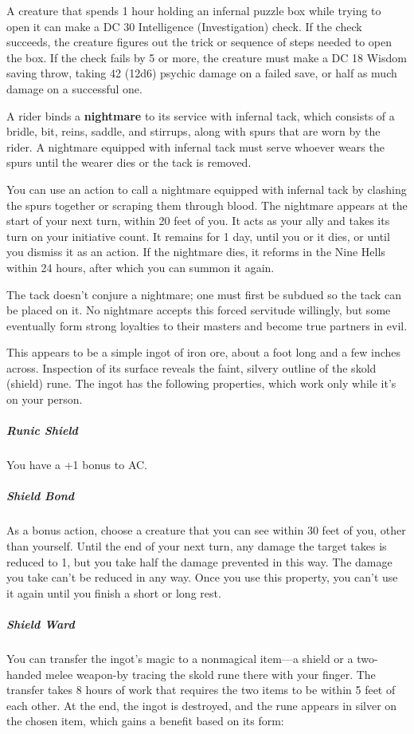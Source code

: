 \documentclass[10pt,a4paper,twoside,bg=print,twocolumn,openany,nodeprecatedcode]{dndbook}
\begin{document}
A creature that spends 1 hour holding an infernal puzzle box while trying to open it can make a DC 30 Intelligence (Investigation) check. If the check succeeds, the creature figures out the trick or sequence of steps needed to open the box. If the check fails by 5 or more, the creature must make a DC 18 Wisdom saving throw, taking 42 (12d6) psychic damage on a failed save, or half as much damage on a successful one.

A rider binds a \textbf{nightmare} to its service with infernal tack, which consists of a bridle, bit, reins, saddle, and stirrups, along with spurs that are worn by the rider. A nightmare equipped with infernal tack must serve whoever wears the spurs until the wearer dies or the tack is removed.

You can use an action to call a nightmare equipped with infernal tack by clashing the spurs together or scraping them through blood. The nightmare appears at the start of your next turn, within 20 feet of you. It acts as your ally and takes its turn on your initiative count. It remains for 1 day, until you or it dies, or until you dismiss it as an action. If the nightmare dies, it reforms in the Nine Hells within 24 hours, after which you can summon it again.

The tack doesn't conjure a nightmare; one must first be subdued so the tack can be placed on it. No nightmare accepts this forced servitude willingly, but some eventually form strong loyalties to their masters and become true partners in evil.

This appears to be a simple ingot of iron ore, about a foot long and a few inches across. Inspection of its surface reveals the faint, silvery outline of the skold (shield) rune. The ingot has the following properties, which work only while it's on your person.

\subparagraph{Runic Shield}
You have a +1 bonus to AC.

\subparagraph{Shield Bond}
As a bonus action, choose a creature that you can see within 30 feet of you, other than yourself. Until the end of your next turn, any damage the target takes is reduced to 1, but you take half the damage prevented in this way. The damage you take can't be reduced in any way. Once you use this property, you can't use it again until you finish a short or long rest.

\subparagraph{Shield Ward}
You can transfer the ingot's magic to a nonmagical item—a shield or a two-handed melee weapon-by tracing the skold rune there with your finger. The transfer takes 8 hours of work that requires the two items to be within 5 feet of each other. At the end, the ingot is destroyed, and the rune appears in silver on the chosen item, which gains a benefit based on its form:
\end{document}

